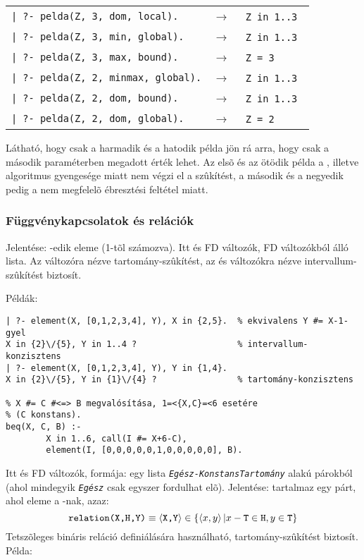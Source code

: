 \begin{tabular}{ll}
\verb'| ?- pelda(Z, 3, dom, local).'    & $\rightarrow$ \verb'  Z in 1..3 '  \\
\verb'| ?- pelda(Z, 3, min, global).'   & $\rightarrow$ \verb'  Z in 1..3 '  \\
\verb'| ?- pelda(Z, 3, max, bound).'    & $\rightarrow$ \verb'  Z = 3     '  \\
\verb'| ?- pelda(Z, 2, minmax, global).'& $\rightarrow$ \verb'  Z in 1..3 '  \\
\verb'| ?- pelda(Z, 2, dom, bound).'    & $\rightarrow$ \verb'  Z in 1..3 '  \\
\verb'| ?- pelda(Z, 2, dom, global).'   & $\rightarrow$ \verb'  Z = 2     '  \\
\end{tabular}
\br
Látható, hogy csak a harmadik és a hatodik példa jön rá arra, hogy  csak
a második paraméterben megadott érték lehet. Az elsõ és az ötödik példa a ,
illetve  algoritmus gyengesége miatt nem végzi el a szûkítést, a második
és a negyedik pedig a nem megfelelõ ébresztési feltétel miatt.

\subsubsection{Függvénykapcsolatok és relációk}

{}

Jelentése:  -edik eleme  (1-tõl számozva). Itt  és 
FD változók,  FD változókból álló lista. Az  változóra nézve
tartomány-szûkítést, az  és  változókra nézve intervallum-szûkítést
biztosít. 

Példák: 

\begin{verbatim}
| ?- element(X, [0,1,2,3,4], Y), X in {2,5}.  % ekvivalens Y #= X-1-gyel
X in {2}\/{5}, Y in 1..4 ?                    % intervallum-konzisztens
| ?- element(X, [0,1,2,3,4], Y), Y in {1,4}.
X in {2}\/{5}, Y in {1}\/{4} ?                % tartomány-konzisztens

% X #= C #<=> B megvalósítása, 1=<{X,C}=<6 esetére
% (C konstans).
beq(X, C, B) :- 
        X in 1..6, call(I #= X+6-C), 
        element(I, [0,0,0,0,0,1,0,0,0,0,0], B).
\end{verbatim}

\medskip
{}

Itt  és  FD változók,  formája: egy lista
{\tt\em Egész-KonstansTartomány} alakú párokból (ahol mindegyik {\tt\em Egész}
csak egyszer fordulhat elõ). Jelentése:  tartalmaz egy  párt,
ahol  eleme a -nak, azaz: \[ \texttt{relation(X,H,Y)} \equiv \left\langle\texttt{X,Y}\right\rangle
\in \{\left\langle x,y\right\rangle|x-\texttt{T} \in \texttt{H}, y \in \texttt{T}\}\] Tetszõleges bináris reláció
definiálására használható, tartomány-szûkítést biztosít. Példa:

